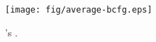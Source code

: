 \begin{figure}[!ht]
\begin{center}
\texttt{[image: fig/average-bcfg.eps]}
\caption{'s \BG.}\label{fig-average-bcfg}
\end{center}
\end{figure}
